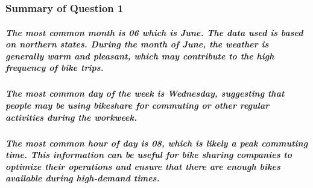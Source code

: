\documentclass[11pt]{article}
\begin{document}
    \begin{center}
    \end{center}
    { \hspace*{\fill} \\}
    
    \begin{center}
    \end{center}
    { \hspace*{\fill} \\}
    
    \hypertarget{summary-of-question-1}{%
\subsubsection{Summary of Question 1}\label{summary-of-question-1}}

\hypertarget{the-most-common-month-is-06-which-is-june.-the-data-used-is-based-on-northern-states.-during-the-month-of-june-the-weather-is-generally-warm-and-pleasant-which-may-contribute-to-the-high-frequency-of-bike-trips.}{%
\subparagraph{The most common month is 06 which is June. The data used
is based on northern states. During the month of June, the weather is
generally warm and pleasant, which may contribute to the high frequency
of bike
trips.}\label{the-most-common-month-is-06-which-is-june.-the-data-used-is-based-on-northern-states.-during-the-month-of-june-the-weather-is-generally-warm-and-pleasant-which-may-contribute-to-the-high-frequency-of-bike-trips.}}

\hypertarget{the-most-common-day-of-the-week-is-wednesday-suggesting-that-people-may-be-using-bikeshare-for-commuting-or-other-regular-activities-during-the-workweek.}{%
\subparagraph{The most common day of the week is Wednesday, suggesting
that people may be using bikeshare for commuting or other regular
activities during the
workweek.}\label{the-most-common-day-of-the-week-is-wednesday-suggesting-that-people-may-be-using-bikeshare-for-commuting-or-other-regular-activities-during-the-workweek.}}

\hypertarget{the-most-common-hour-of-day-is-08-which-is-likely-a-peak-commuting-time.-this-information-can-be-useful-for-bike-sharing-companies-to-optimize-their-operations-and-ensure-that-there-are-enough-bikes-available-during-high-demand-times.}{%
\subparagraph{The most common hour of day is 08, which is likely a peak
commuting time. This information can be useful for bike sharing
companies to optimize their operations and ensure that there are enough
bikes available during high-demand
times.}\label{the-most-common-hour-of-day-is-08-which-is-likely-a-peak-commuting-time.-this-information-can-be-useful-for-bike-sharing-companies-to-optimize-their-operations-and-ensure-that-there-are-enough-bikes-available-during-high-demand-times.}}
\end{document}
